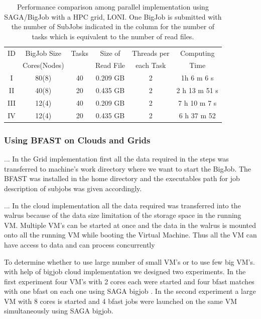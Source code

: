 \documentclass{acm_proc_article-sp}
\begin{document}
 \begin{table}
 \begin{tabular}{|ccccc|c |} 
 \hline 
ID & BigJob Size  &  Tasks & Size of  & Threads per  &  Computing  \\
   & Cores(Nodes) &  & Read File & each Task &  Time\\\hline
I   & 80(8) &  40 & 0.209 GB & 2 & 1h 6 m 6 s \\
II  & 40(8)  &  20 & 0.435 GB & 2 & 2 h 13 m 51 s\\
III & 12(4)  & 40  & 0.209 GB & 2 & 7 h 10 m 7 s \\
IV & 12(4)  & 20 & 0.435 GB & 2 &  6 h 37 m 52  \\
\hline
\end{tabular}
\caption{Performance comparison among parallel implementation using SAGA/BigJob with a HPC grid, LONI. One BigJob is submitted with the number of SubJobs indicated in the column for the number of tasks which is equivalent to the number of read files.}
  \label{table:bigjob-loni} 
\end{table}
 


\subsubsection{Using BFAST on Clouds and Grids}

...  In the Grid implementation first all the
data required in the steps was transferred to machine's work directory
where we want to start the BigJob. The BFAST was installed in the home
directory and the executables path for job description of subjobs was
given accordingly.

...  In the cloud implementation all the data
required was transferred into the walrus because of the data size
limitation of the storage space in the running VM. Multiple VM's can
be started at once and the data in the walrus is mounted onto all the
running VM while booting the Virtual Machine. Thus all the VM can have
access to data and can process concurrently


To determine whether to use large number of small VM's or to use few
big VM's. with help of bigjob cloud implementation we designed two
experiments. In the first experiment four VM's with 2 cores each were
started and four bfast matches with one bfast on each one using SAGA
bigjob . In the second experiment a large VM with 8 cores is started
and 4 bfast jobs were launched on the same VM simultaneously using
SAGA bigjob.
\end{document}
